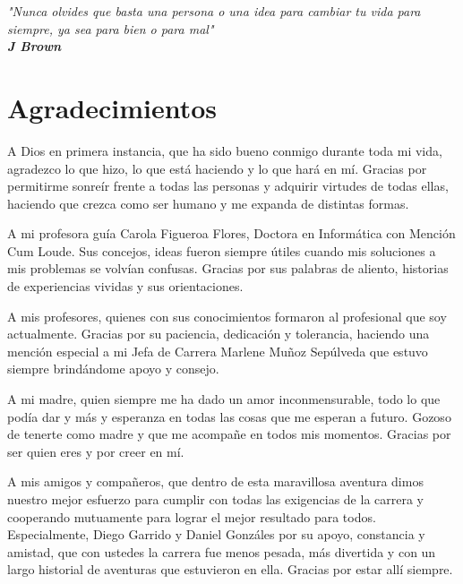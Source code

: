 \newpage{\ }
\setcounter{page}{1}
\thispagestyle{empty}
\vfill
\begin{flushright}
	\emph{"Nunca olvides que basta una persona o una idea para cambiar tu vida para siempre, ya sea para bien o para mal"}\\
	\textbf{\textit{J Brown}}
\end{flushright}
\vfill

\chapter*{Agradecimientos}

A Dios en primera instancia, que ha sido bueno conmigo durante toda mi vida, agradezco lo que hizo, lo que está haciendo y lo que hará en mí. Gracias por permitirme sonreír frente a todas las personas y adquirir virtudes de todas ellas, haciendo que crezca como ser humano y me expanda de distintas formas.\\
\par A mi profesora guía Carola Figueroa Flores, Doctora en Informática con Mención Cum Loude. Sus concejos, ideas fueron siempre útiles cuando mis soluciones a mis problemas se volvían confusas. Gracias por sus palabras de aliento, historias de experiencias vividas y sus orientaciones.\\
\par A mis profesores, quienes con sus conocimientos formaron al profesional que soy actualmente. Gracias por su paciencia, dedicación y tolerancia, haciendo una mención especial a mi Jefa de Carrera Marlene Muñoz Sepúlveda que estuvo siempre brindándome apoyo y consejo.\\
\par A mi madre, quien siempre me ha dado un amor inconmensurable, todo lo que podía dar y más y esperanza en todas las cosas que me esperan a futuro. Gozoso de tenerte como madre y que me acompañe en todos mis momentos. Gracias por ser quien eres y por creer en mí.\\
\par A mis amigos y compañeros, que dentro de esta maravillosa aventura dimos nuestro mejor esfuerzo para cumplir con todas las exigencias de la carrera y cooperando mutuamente para lograr el mejor resultado para todos. Especialmente, Diego Garrido y Daniel Gonzáles por su apoyo, constancia y amistad, que con ustedes la carrera fue menos pesada, más divertida y con un largo historial de aventuras que estuvieron en ella. Gracias por estar allí siempre.


